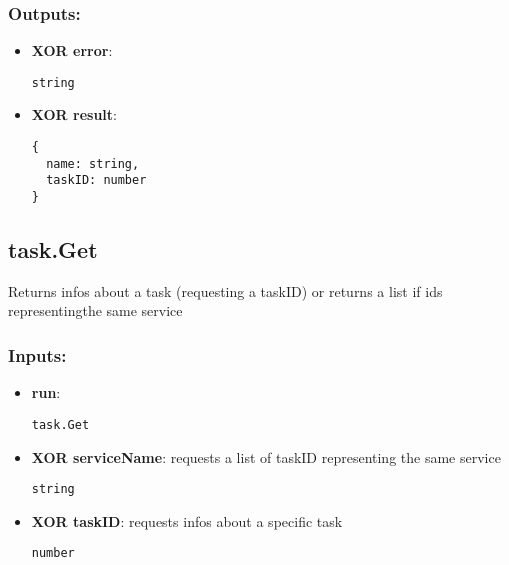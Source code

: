 \subsubsection*{Outputs:}
\begin{itemize}
  \small
    \item \textbf{XOR error}: 
\begin{lstlisting}
string
\end{lstlisting}
    \item \textbf{XOR result}: 
\begin{lstlisting}
{
  name: string, 
  taskID: number
}
\end{lstlisting}
  \end{itemize}

\subsection{task.Get}
\label{ch:builtinservices:task.Get}
Returns infos about a task (requesting a taskID) or returns a list if ids representingthe same service
\subsubsection*{Inputs:}
\begin{itemize}
  \small
    \item \textbf{run}: 
\begin{lstlisting}
task.Get
\end{lstlisting}
    \item \textbf{XOR serviceName}: requests a list of taskID representing the same service
\begin{lstlisting}
string
\end{lstlisting}
    \item \textbf{XOR taskID}: requests infos about a specific task
\begin{lstlisting}
number
\end{lstlisting}
  \end{itemize}
